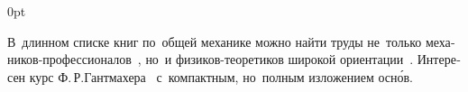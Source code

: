 \section*{\small \wordforbibliography}

\begin{changemargin}{\parindent}{0pt}
\fontsize{10}{12}\selectfont

\begin{otherlanguage}{russian}

В~длинном списке книг по~общей механике можно найти труды не~только механиков\hbox{-}профессионалов~\cite{goldstein-classicalmechanics, treatiseonanalyticaldynamics-by-l.a.pars, loitsjanskiy.lurie, lurie-analyticalmechanics, olkhovskiy-theoreticalmechanicsforphysicists}, но~и физиков\hbox{-}теоретиков широкой ориентации~\cite{landau.lifshitz-shortcourse, terhaar-hamiltonianmechanics}. Интересен курс Ф.\,Р.\;Гантмахера~\cite{gantmacher} с~компактным, но~полным изложением осн\'{о}в.

\end{otherlanguage}

\end{changemargin}

